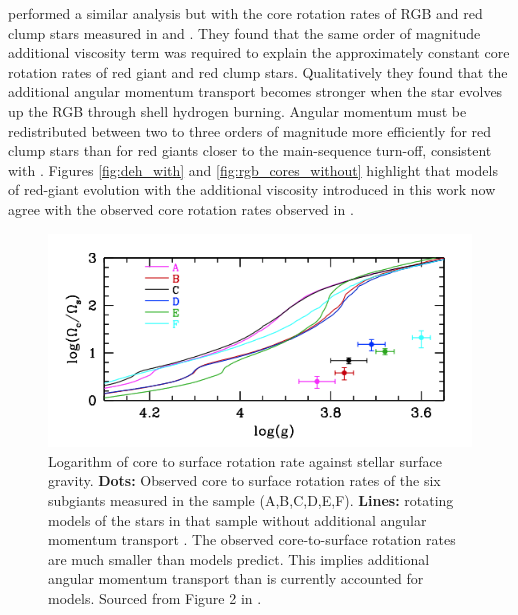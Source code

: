 \citet{moyano_asteroseismology_2022} performed a similar analysis but with the core rotation rates of RGB and red clump stars measured in \citet{mosser_spin_2012} and \citet{gehan_core_2018}.
They found that the same order of magnitude additional viscosity term was required to explain the approximately constant core rotation rates of red giant and red clump stars.  
Qualitatively they found that the additional angular momentum transport becomes stronger when the star evolves up the RGB through shell hydrogen burning.
Angular momentum must be redistributed between two to three orders of
magnitude more efficiently for red clump stars than for red giants closer to the main-sequence turn-off, consistent with \citet{den_hartogh_constraining_2019}.
Figures \ref{fig:deh_with} and \ref{fig:rgb_cores_without}  highlight that models of red-giant evolution with the additional viscosity introduced in this work now agree with the observed core rotation rates observed in \citet{gehan_core_2018}.

\begin{figure}[h]
    \includegraphics[width=\textwidth]{Figures/intro_figures/deheuvels_disparity_without.png}
    \caption[A comparison of modelled and observed core to surface rotation rate ratios of post-main-sequence stars without additional angular momentum transport.]{Logarithm of core to surface rotation rate against stellar surface gravity. 
    \textbf{Dots:} Observed core to surface rotation rates of the six subgiants measured in the \citet{deheuvels_seismic_2014} sample (A,B,C,D,E,F).
    \textbf{Lines:} rotating models of the stars in that sample without additional angular momentum transport \citep{eggenberger_asteroseismology_2019}.
    The observed core-to-surface rotation rates are much smaller than models predict. This implies additional angular momentum transport than is currently accounted for models.
    Sourced from Figure 2 in \citet{eggenberger_asteroseismology_2019}.}
    \label{fig:deh_without}
\end{figure}

